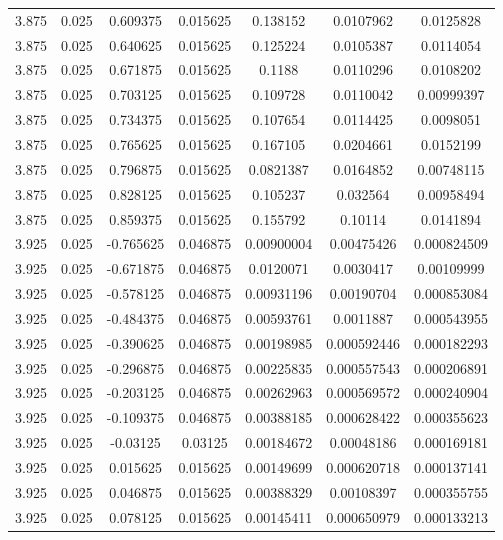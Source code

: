 \begin{table}[bh]
\begin{center}
{\begin{tabular}{ccccccc}
3.875	 & 0.025 & 	0.609375	 & 0.015625	 & 0.138152	 & 0.0107962	 & 0.0125828 \\ 
3.875	 & 0.025 & 	0.640625	 & 0.015625	 & 0.125224	 & 0.0105387	 & 0.0114054 \\ 
3.875	 & 0.025 & 	0.671875	 & 0.015625	 & 0.1188	 & 0.0110296	 & 0.0108202 \\ 
3.875	 & 0.025 & 	0.703125	 & 0.015625	 & 0.109728	 & 0.0110042	 & 0.00999397 \\ 
3.875	 & 0.025 & 	0.734375	 & 0.015625	 & 0.107654	 & 0.0114425	 & 0.0098051 \\ 
3.875	 & 0.025 & 	0.765625	 & 0.015625	 & 0.167105	 & 0.0204661	 & 0.0152199 \\ 
3.875	 & 0.025 & 	0.796875	 & 0.015625	 & 0.0821387	 & 0.0164852	 & 0.00748115 \\ 
3.875	 & 0.025 & 	0.828125	 & 0.015625	 & 0.105237	 & 0.032564	 & 0.00958494 \\ 
3.875	 & 0.025 & 	0.859375	 & 0.015625	 & 0.155792	 & 0.10114	 & 0.0141894 \\ 
3.925	 & 0.025 & 	-0.765625	 & 0.046875	 & 0.00900004	 & 0.00475426	 & 0.000824509 \\ 
3.925	 & 0.025 & 	-0.671875	 & 0.046875	 & 0.0120071	 & 0.0030417	 & 0.00109999 \\ 
3.925	 & 0.025 & 	-0.578125	 & 0.046875	 & 0.00931196	 & 0.00190704	 & 0.000853084 \\ 
3.925	 & 0.025 & 	-0.484375	 & 0.046875	 & 0.00593761	 & 0.0011887	 & 0.000543955 \\ 
3.925	 & 0.025 & 	-0.390625	 & 0.046875	 & 0.00198985	 & 0.000592446	 & 0.000182293 \\ 
3.925	 & 0.025 & 	-0.296875	 & 0.046875	 & 0.00225835	 & 0.000557543	 & 0.000206891 \\ 
3.925	 & 0.025 & 	-0.203125	 & 0.046875	 & 0.00262963	 & 0.000569572	 & 0.000240904 \\ 
3.925	 & 0.025 & 	-0.109375	 & 0.046875	 & 0.00388185	 & 0.000628422	 & 0.000355623 \\ 
3.925	 & 0.025 & 	-0.03125	 & 0.03125	 & 0.00184672	 & 0.00048186	 & 0.000169181 \\ 
3.925	 & 0.025 & 	0.015625	 & 0.015625	 & 0.00149699	 & 0.000620718	 & 0.000137141 \\ 
3.925	 & 0.025 & 	0.046875	 & 0.015625	 & 0.00388329	 & 0.00108397	 & 0.000355755 \\ 
3.925	 & 0.025 & 	0.078125	 & 0.015625	 & 0.00145411	 & 0.000650979	 & 0.000133213 \\ 

\end{tabular}}
\end{center}
\end{table}
